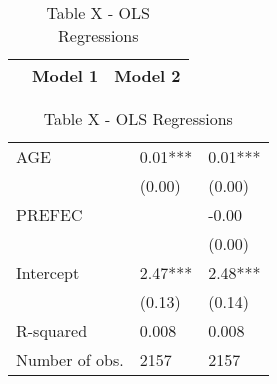 \begin{table}
\caption{Table X - OLS Regressions} \\
\begin{center}
\begin{tabular}{lcc}
\hline
               & Model 1 & Model 2  \\
\hline
\hline
\end{tabular}
\begin{tabular}{lll}
AGE            & 0.01*** & 0.01***  \\
               & (0.00)  & (0.00)   \\
PREFEC         &         & -0.00    \\
               &         & (0.00)   \\
Intercept      & 2.47*** & 2.48***  \\
               & (0.13)  & (0.14)   \\
R-squared      & 0.008   & 0.008    \\
Number of obs. & 2157    & 2157     \\
\hline
\end{tabular}
\end{center}
\end{table}